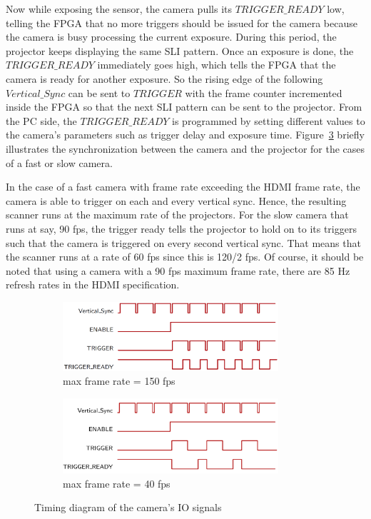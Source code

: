 \documentclass[]{spie}  %
\begin{document}
Now while exposing the sensor, the camera pulls its $TRIGGER\_READY$ low, telling the FPGA that no more triggers should be issued for the camera because the camera is busy processing the current exposure. During this period, the projector keeps displaying the same SLI pattern. Once an exposure is done, the $TRIGGER\_READY$ immediately goes high,  which tells the FPGA that the camera is ready for another exposure. So the rising edge of the following $Vertical\_Sync$ can be sent to $TRIGGER$ with the frame counter incremented inside the FPGA so that the next SLI pattern can be sent to the projector. From the PC side, the $TRIGGER\_READY$ is programmed by setting different values to the camera's parameters such as trigger delay and exposure time. Figure~\ref{Fig:7} briefly illustrates the synchronization between the camera and the projector for the cases of a fast or slow camera. 

In the case of a fast camera with frame rate exceeding the HDMI frame rate, the camera is able to trigger on each and every vertical sync.  Hence, the resulting scanner runs at the maximum rate of the projectors.  For the slow camera that runs at say, 90 fps, the trigger ready tells the projector to hold on to its triggers such that the camera is triggered on every second vertical sync.  That means that the scanner runs at a rate of 60 fps since this is 120/2 fps. Of course, it should be noted that using a camera with a 90 fps maximum frame rate, there are 85 Hz refresh rates in the HDMI specification.

\begin{figure}
\centering
\begin{subfigure}{.5\textwidth}
  \centering
  \includegraphics[width=8cm]{phase2.png}
  \caption{max frame rate = 150 fps}
  \label{fig:sub3}
\end{subfigure}%
\begin{subfigure}{.5\textwidth}
  \centering
   \includegraphics[width=8cm]{gpio.png}
  \caption{max frame rate = 40 fps}
  \label{fig:sub4}
\end{subfigure}
\caption{Timing diagram of the camera's IO signals}
\label{Fig:7}
\end{figure}
\end{document}
